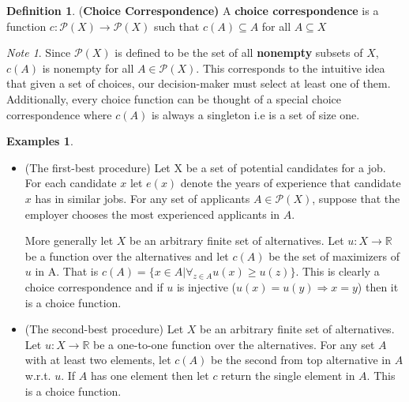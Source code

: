 \documentclass[12pt]{article}
\theoremstyle{plain}
\theoremstyle{definition}
\newtheorem{defin}{Definition}[subsection]
\newtheorem{unex}[ex]{Examples}
\theoremstyle{remark}
\newtheorem*{note}{Note}
\newcommand{\tn}[1]{\textnormal{#1}}
\newcommand{\pp}[1]{\mathcal{P}(#1)}
\newcommand{\3}{\vspace*{3mm}}
\newcommand{\name}[1]{\tn{(\textbf{#1)}}}
\newcommand{\RR}{\mathbb{R}}
\newcommand{\RIGHT}{\Longrightarrow}
\begin{document}
\begin{defin} \name{Choice Correspondence} 
A \textbf{choice correspondence} is a function $c: \pp{X} \to \pp{X}$ such that $c(A) \subseteq A$ for all $A \subseteq X$
\end{defin}

\begin{note}
Since $\pp{X}$ is defined to be the set of all \textbf{nonempty} subsets of $X$, $c(A)$ is nonempty for all $A \in \pp{X}$. This corresponds to the intuitive idea that given a set of choices, our decision-maker must select at least one of them.  Additionally, every choice function can be thought of a special choice correspondence where $c(A)$ is always a singleton i.e is a set of size one.
\end{note}

\begin{unex}
\
\begin{itemize}
\item (The first-best procedure) Let X be a set of potential candidates for a job. For each candidate $x$ let $e(x)$ denote the years of experience that candidate $x$ has in similar jobs. For any set of applicants $A \in \pp{X}$, suppose that the employer chooses the most experienced applicants in $A$.

\quad More generally let $X$ be an arbitrary finite set of alternatives. Let $u : X \to \RR$ be a function over the alternatives and let $c(A)$ be the set of maximizers of $u$ in A. That is $c(A) = \{x \in A |{\forall}_{z \in A} u(x) \geq u(z)\}$. This is clearly a choice correspondence and if $u$ is injective ($u(x) = u(y) \RIGHT x = y$) then it is a choice function.

\item (The second-best procedure) Let $X$ be an arbitrary finite set of alternatives. Let $u : X \to \RR$ be a one-to-one function over the alternatives. For any set $A$ with at least two elements, let $c(A)$ be the second from top alternative in $A$ w.r.t. $u$. If $A$ has one element then let $c$ return the single element in $A$. This is a choice function.


\end{itemize}
\end{unex}
\end{document}

